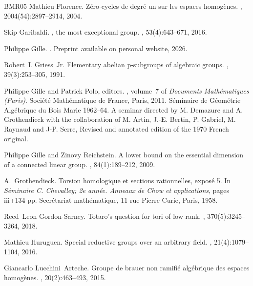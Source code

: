 \documentclass[12pt]{amsart}
\numberwithin{equation}{section}
\theoremstyle{remark}
\begin{document}
\begin{thebibliography}{BMR05}
Mathieu Florence.
\newblock Z\'{e}ro-cycles de degr\'{e} un sur les espaces homog\`enes.
, 2004(54):2897--2914, 2004.

Skip Garibaldi.
, the most exceptional group.
, 53(4):643--671, 2016.

Philippe Gille.
.
\newblock Preprint available on personal website, 2026.

Robert~L Griess~Jr.
\newblock Elementary abelian p-subgroups of algebraic groups.
, 39(3):253--305, 1991.

Philippe Gille and Patrick Polo, editors.
, volume~7 of {\em Documents Math\'{e}matiques (Paris)}.
\newblock Soci\'{e}t\'{e} Math\'{e}matique de France, Paris, 2011.
\newblock S\'{e}minaire de G\'{e}om\'{e}trie Alg\'{e}brique du Bois Marie 1962--64. A seminar directed by M. Demazure and A. Grothendieck with the collaboration of M. Artin, J.-E. Bertin, P. Gabriel, M. Raynaud and J-P. Serre, Revised and annotated edition of the 1970 French original.

Philippe Gille and Zinovy Reichstein.
\newblock A lower bound on the essential dimension of a connected linear group.
, 84(1):189--212, 2009.

A.~Grothendieck.
\newblock Torsion homologique et sections rationnelles, expos\'e 5.
\newblock In {\em S\'{e}minaire {C}. {C}hevalley; 2e ann\'{e}e. {A}nneaux de {C}how et applications}, pages iii+134 pp. Secr\'{e}tariat math\'{e}matique, 11 rue Pierre Curie, Paris, 1958.

Reed~Leon Gordon-Sarney.
\newblock Totaro's question for tori of low rank.
, 370(5):3245--3264, 2018.

Mathieu Huruguen.
\newblock Special reductive groups over an arbitrary field.
, 21(4):1079--1104, 2016.

Giancarlo Lucchini~Arteche.
\newblock Groupe de brauer non ramifi{\'e} alg{\'e}brique des espaces homog{\`e}nes.
, 20(2):463--493, 2015.


\end{thebibliography}
\end{document}
